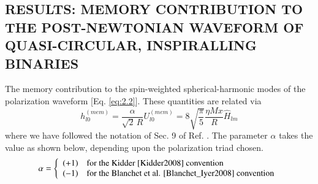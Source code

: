 \documentclass[twocolumn,showpacs,aps,prd,nobibnotes,floatfix]{revtex4-1}
\begin{document}
\begin{widetext}
\subsection{RESULTS: MEMORY CONTRIBUTION TO THE POST-NEWTONIAN WAVEFORM OF QUASI-CIRCULAR, INSPIRALLING BINARIES}
The memory contribution to the spin-weighted spherical-harmonic modes of the polarization waveform [Eq. \ref{eq:2.2}]. These quantities are related via 
\begin{equation}
	h_{l0}^{(mem)} = \frac{\alpha}{\sqrt{2} \, R} U_{l0}^{(mem)} = 8 \sqrt{\frac{\pi}{5}}\frac{\eta M x}{R}\hat{H}_{lm}
\end{equation}
where we have followed the notation of Sec. 9 of Ref. \cite{Blanchet_Iyer2008}. The parameter $\alpha$ takes the value as shown below, depending upon the polarization triad chosen. 
\begin{equation}
\alpha = \left\{
\begin{array}{ll}
(+1) & \text{for the Kidder  \cite{Kidder2008} convention} \\
(-1) & \text{for the Blanchet et al. \cite{Blanchet_Iyer2008}   convention}\\
\end{array} 
\right.
\end{equation}


\end{widetext}
\end{document}
